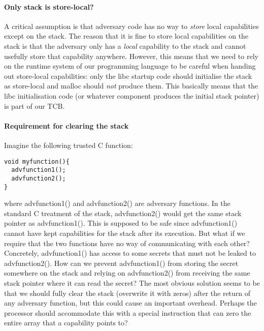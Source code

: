 \documentclass[a4paper]{article}
\begin{document}
\paragraph{Only stack is store-local?}
A critical assumption is that adversary code has no way to \emph{store} local
capabilities except on the stack. The reason that it is fine to store local
capabilities on the stack is that the adversary only has a \emph{local}
capability to the stack and cannot usefully store that capability anywhere.
However, this means that we need to rely on the runtime system of our
programming language to be careful when handing out store-local capabilities:
only the libc startup code should initialise the stack as store-local and malloc
should \emph{not} produce them. This basically means that the libc
initialisation code (or whatever component produces the initial stack pointer)
is part of our TCB.

\paragraph{Requirement for clearing the stack}
Imagine the following trusted C function:

\begin{verbatim}
void myfunction(){
  advfunction1();
  advfunction2();
}
\end{verbatim}

where advfunction1() and advfunction2() are adversary functions. In the standard
C treatment of the stack, advfunction2() would get the same stack pointer as
advfunction1(). This is supposed to be safe since advfunction1() cannot have
kept capabilities for the stack after its execution. But what if we require that
the two functions have no way of communicating with each other? Concretely,
advfunction1() has access to some secrets that must not be leaked to
advfunction2(). How can we prevent advfunction1() from storing the secret
somewhere on the stack and relying on advfunction2() from receiving the same
stack pointer where it can read the secret? The most obvious solution seems to
be that we should fully clear the stack (overwrite it with zeros) after the
return of any adversary function, but this could cause an important overhead.
Perhaps the processor should accommodate this with a special instruction that can
zero the entire array that a capability points to?
\end{document}
